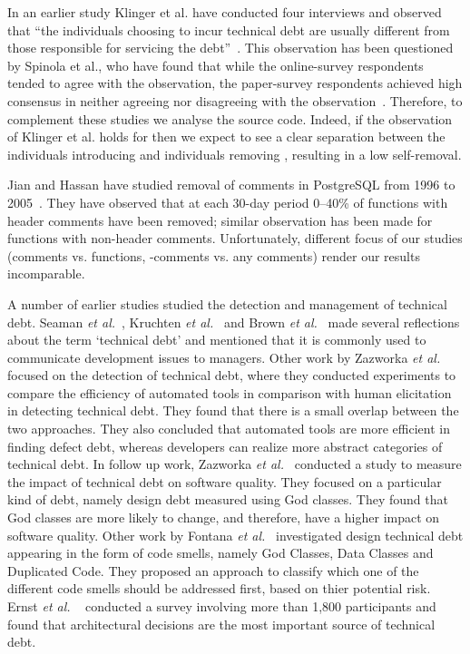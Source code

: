 In an earlier study Klinger et al. have conducted four interviews and observed that ``the individuals choosing to incur technical debt are usually different from those responsible for servicing the debt''~\cite{Klinger:etal}. 
This observation has been questioned by Spinola et al., who have found that while the online-survey respondents tended to agree with the observation,
the paper-survey respondents achieved high consensus in neither agreeing nor disagreeing with the observation~\cite{Spinola:etal}.
Therefore, to complement these studies we analyse the source code.
Indeed, if the observation of Klinger et al. holds for \SATD then we expect to see a clear separation between the individuals introducing \SATD and
individuals removing \SATD, resulting in a low \SATD self-removal.

Jian and Hassan have studied removal of comments in PostgreSQL from 1996 to 2005~\cite{Jiang:Hassan}. 
They have observed that at each 30-day period 0--40\% of functions with header comments have been removed; similar observation has been made for functions with non-header comments. 
Unfortunately, different focus of our studies (comments vs. functions, \SATD-comments vs. any comments) render our results incomparable.



A number of earlier studies studied the detection and management of technical debt. Seaman \textit{et al.}~\cite{Seaman2011}, Kruchten \textit{et al.}~\cite{Kruchten2013IWMTD} and Brown \textit{et al.}~\cite{Brown2010MTD} made several reflections about the term `technical debt' and mentioned that it is commonly used to communicate development issues to managers. Other work by Zazworka \textit{et al.} \cite{Zazworka2013EASE} focused on the detection of technical debt, where they conducted experiments to compare the efficiency of automated tools in comparison with human elicitation in detecting technical debt. They found that there is a small overlap between the two approaches. They also concluded that automated tools are more efficient in finding defect debt, whereas developers can realize more abstract categories of technical debt. In follow up work, Zazworka \textit{et al.}~\cite{Zazworka2011MTD} conducted a study to measure the impact of technical debt on software quality. They focused on a particular kind of debt, namely design debt measured using God classes. They found that God classes are more likely to change, and therefore, have a higher impact on software quality. Other work by Fontana \textit{et al.}~\cite{Fontana2012MTD} investigated design technical debt appearing in the form of code smells, namely God Classes, Data Classes and Duplicated Code. They proposed an approach to classify which one of the different code smells should be addressed first, based on thier potential risk. Ernst \textit{et al.} ~\cite{Ernst2015FSE} conducted a survey involving more than 1,800 participants and found that architectural decisions are the most important source of technical debt.


